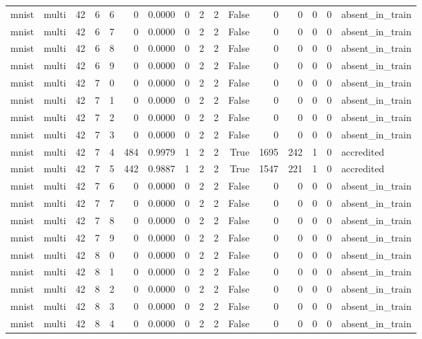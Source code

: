 \begin{tabular}{llrrrrrrrrrrrrrl}
mnist & multi & 42 & 6 & 6 & 0 & 0.0000 & 0 & 2 & 2 & False & 0 & 0 & 0 & 0 & absent\_in\_train \\
mnist & multi & 42 & 6 & 7 & 0 & 0.0000 & 0 & 2 & 2 & False & 0 & 0 & 0 & 0 & absent\_in\_train \\
mnist & multi & 42 & 6 & 8 & 0 & 0.0000 & 0 & 2 & 2 & False & 0 & 0 & 0 & 0 & absent\_in\_train \\
mnist & multi & 42 & 6 & 9 & 0 & 0.0000 & 0 & 2 & 2 & False & 0 & 0 & 0 & 0 & absent\_in\_train \\
mnist & multi & 42 & 7 & 0 & 0 & 0.0000 & 0 & 2 & 2 & False & 0 & 0 & 0 & 0 & absent\_in\_train \\
mnist & multi & 42 & 7 & 1 & 0 & 0.0000 & 0 & 2 & 2 & False & 0 & 0 & 0 & 0 & absent\_in\_train \\
mnist & multi & 42 & 7 & 2 & 0 & 0.0000 & 0 & 2 & 2 & False & 0 & 0 & 0 & 0 & absent\_in\_train \\
mnist & multi & 42 & 7 & 3 & 0 & 0.0000 & 0 & 2 & 2 & False & 0 & 0 & 0 & 0 & absent\_in\_train \\
mnist & multi & 42 & 7 & 4 & 484 & 0.9979 & 1 & 2 & 2 & True & 1695 & 242 & 1 & 0 & accredited \\
mnist & multi & 42 & 7 & 5 & 442 & 0.9887 & 1 & 2 & 2 & True & 1547 & 221 & 1 & 0 & accredited \\
mnist & multi & 42 & 7 & 6 & 0 & 0.0000 & 0 & 2 & 2 & False & 0 & 0 & 0 & 0 & absent\_in\_train \\
mnist & multi & 42 & 7 & 7 & 0 & 0.0000 & 0 & 2 & 2 & False & 0 & 0 & 0 & 0 & absent\_in\_train \\
mnist & multi & 42 & 7 & 8 & 0 & 0.0000 & 0 & 2 & 2 & False & 0 & 0 & 0 & 0 & absent\_in\_train \\
mnist & multi & 42 & 7 & 9 & 0 & 0.0000 & 0 & 2 & 2 & False & 0 & 0 & 0 & 0 & absent\_in\_train \\
mnist & multi & 42 & 8 & 0 & 0 & 0.0000 & 0 & 2 & 2 & False & 0 & 0 & 0 & 0 & absent\_in\_train \\
mnist & multi & 42 & 8 & 1 & 0 & 0.0000 & 0 & 2 & 2 & False & 0 & 0 & 0 & 0 & absent\_in\_train \\
mnist & multi & 42 & 8 & 2 & 0 & 0.0000 & 0 & 2 & 2 & False & 0 & 0 & 0 & 0 & absent\_in\_train \\
mnist & multi & 42 & 8 & 3 & 0 & 0.0000 & 0 & 2 & 2 & False & 0 & 0 & 0 & 0 & absent\_in\_train \\
mnist & multi & 42 & 8 & 4 & 0 & 0.0000 & 0 & 2 & 2 & False & 0 & 0 & 0 & 0 & absent\_in\_train \\

\end{tabular}
